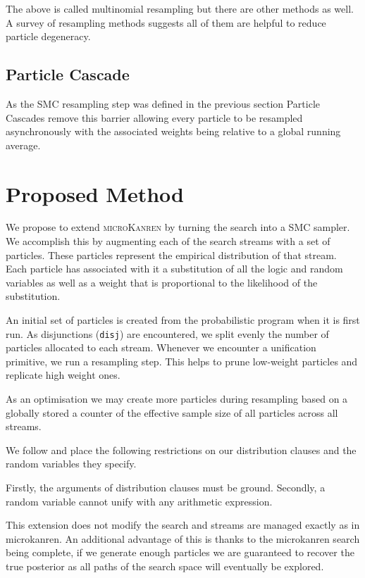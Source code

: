 \documentclass[
]{ceurart}
\begin{document}
The above is called multinomial resampling but there are other methods
as well. A survey\cite{douc2005comparison} of resampling methods
suggests all of them are helpful to reduce particle degeneracy.

\subsection{Particle Cascade}

As the SMC resampling step was defined in the previous section
Particle Cascades \cite{PaigeWDT14} remove this barrier allowing
every particle to be resampled asynchronously with the associated
weights being relative to a global running average. %

\section{Proposed Method}

We propose to extend \textsc{microKanren} by turning the search into a
SMC sampler. We accomplish this by augmenting each of the search
streams with a set of particles. These particles represent the
empirical distribution of that stream. Each particle has associated
with it a substitution of all the logic and random variables as well
as a weight that is proportional to the likelihood of the
substitution.

An initial set of particles is created from the probabilistic program
when it is first run. As disjunctions (\texttt{disj}) are encountered,
we split evenly the number of particles allocated to each stream. Whenever
we encounter a unification primitive, we run a resampling step. This
helps to prune low-weight particles and replicate high weight ones.

As an optimisation we may create more particles during resampling
based on a globally stored a counter of the effective sample size of
all particles across all streams.

We follow \cite{gutmann2010extending} and place the following restrictions
on our distribution clauses and the random variables they specify.

Firstly, the arguments of distribution clauses must be
ground. Secondly, a random variable cannot unify with any arithmetic
expression.

This extension does not modify the search and streams are managed
exactly as in microkanren. An additional advantage of this is thanks
to the microkanren search being complete, if we generate enough
particles we are guaranteed to recover the true posterior as all paths
of the search space will eventually be explored.
\end{document}
